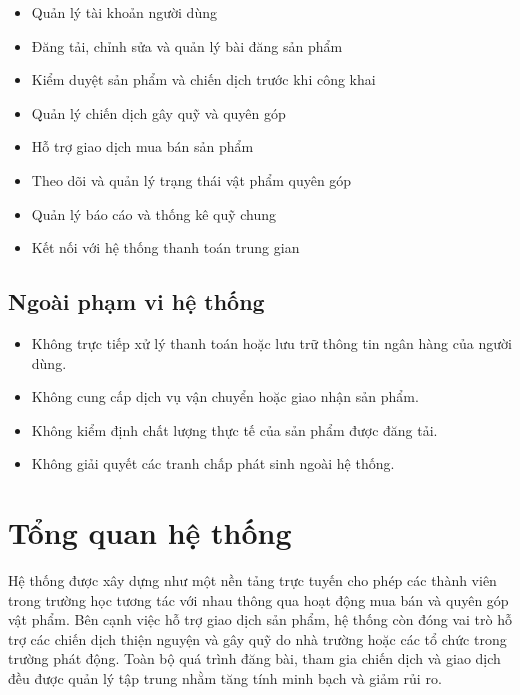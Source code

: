 \documentclass[12pt,a4paper]{report}
\begin{document}
\begin{itemize}[label=--,leftmargin=1.2cm,itemsep=0.4em]
    \item Quản lý tài khoản người dùng
    \item Đăng tải, chỉnh sửa và quản lý bài đăng sản phẩm
    \item Kiểm duyệt sản phẩm và chiến dịch trước khi công khai
    \item Quản lý chiến dịch gây quỹ và quyên góp
    \item Hỗ trợ giao dịch mua bán sản phẩm
    \item Theo dõi và quản lý trạng thái vật phẩm quyên góp
    \item Quản lý báo cáo và thống kê quỹ chung
    \item Kết nối với hệ thống thanh toán trung gian
\end{itemize}

\subsection{Ngoài phạm vi hệ thống}

\begin{itemize}[label=--, leftmargin=1.2cm]

\item Không trực tiếp xử lý thanh toán hoặc lưu trữ thông tin ngân hàng của người dùng.

\item Không cung cấp dịch vụ vận chuyển hoặc giao nhận sản phẩm.

\item Không kiểm định chất lượng thực tế của sản phẩm được đăng tải.

\item Không giải quyết các tranh chấp phát sinh ngoài hệ thống.

\end{itemize}

\section{Tổng quan hệ thống}

Hệ thống được xây dựng như một nền tảng trực tuyến cho phép các thành
viên trong trường học tương tác với nhau thông qua hoạt động mua bán
và quyên góp vật phẩm. Bên cạnh việc hỗ trợ giao dịch sản phẩm, hệ thống còn
đóng vai trò hỗ trợ các chiến dịch thiện nguyện và gây quỹ do nhà trường hoặc
các tổ chức trong trường phát động. Toàn bộ quá trình đăng bài, tham gia chiến
dịch và giao dịch đều được quản lý tập trung nhằm tăng tính minh bạch và giảm
rủi ro.
\end{document}
